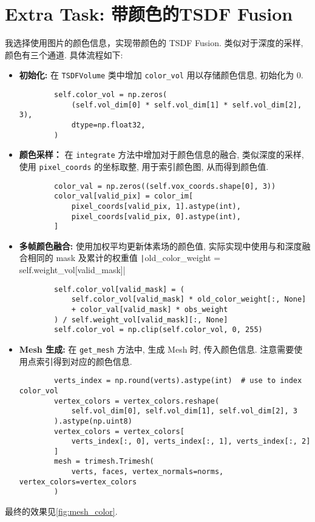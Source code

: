 \documentclass[11pt]{article}
\newcommand\1{\mathds{1}}
\begin{document}
\section{Extra Task: 带颜色的TSDF Fusion}
我选择使用图片的颜色信息，实现带颜色的 TSDF Fusion. 类似对于深度的采样, 颜色有三个通道. 具体流程如下:
\begin{itemize}
    \item \textbf{初始化:} 在 \texttt{TSDFVolume} 类中增加 \texttt{color\_vol} 用以存储颜色信息, 初始化为 0. 
    \begin{verbatim}
        self.color_vol = np.zeros(
            (self.vol_dim[0] * self.vol_dim[1] * self.vol_dim[2], 3),
            dtype=np.float32,
        )
    \end{verbatim}
    \item \textbf{颜色采样：} 在 \texttt{integrate} 方法中增加对于颜色信息的融合, 类似深度的采样, 使用 \texttt{pixel\_coords} 的坐标取整, 用于索引颜色图, 从而得到颜色值.
    \begin{verbatim}
        color_val = np.zeros((self.vox_coords.shape[0], 3))
        color_val[valid_pix] = color_im[
            pixel_coords[valid_pix, 1].astype(int),
            pixel_coords[valid_pix, 0].astype(int),
        ]
    \end{verbatim}
    \item \textbf{多帧颜色融合:} 使用加权平均更新体素场的颜色值, 实际实现中使用与和深度融合相同的 mask 及累计的权重值 \texttt|old_color_weight = self.weight_vol[valid_mask]|
    \begin{verbatim}
        self.color_vol[valid_mask] = (
            self.color_vol[valid_mask] * old_color_weight[:, None]
            + color_val[valid_mask] * obs_weight
        ) / self.weight_vol[valid_mask][:, None]
        self.color_vol = np.clip(self.color_vol, 0, 255)
    \end{verbatim}
    \item \textbf{Mesh 生成:} 在 \texttt{get\_mesh} 方法中, 生成 Mesh 时, 传入颜色信息. 注意需要使用点索引得到对应的颜色信息.
    \begin{verbatim}
        verts_index = np.round(verts).astype(int)  # use to index color_vol
        vertex_colors = vertex_colors.reshape(
            self.vol_dim[0], self.vol_dim[1], self.vol_dim[2], 3
        ).astype(np.uint8)
        vertex_colors = vertex_colors[
            verts_index[:, 0], verts_index[:, 1], verts_index[:, 2]
        ]
        mesh = trimesh.Trimesh(
            verts, faces, vertex_normals=norms, vertex_colors=vertex_colors
        )
    \end{verbatim}
\end{itemize}
最终的效果见\cref{fig:mesh_color}.
\end{document}
